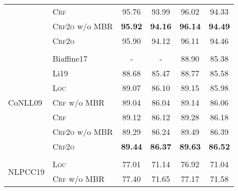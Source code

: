 \begin{table}[tb!]
\begin{tabular}{llcccc}
                             & \textsc{Crf}           & 95.76                   & 93.99                    & 96.02                            & 94.33                            \\
                             & \textsc{Crf2o} w/o MBR & \textbf{95.92}          & \textbf{94.16}           & \textbf{96.14}                   & \textbf{94.49}                   \\
                             & \textsc{Crf2o}         & 95.90                   & 94.12                    & 96.11                            & 94.46                            \\[2pt]
    \hline
    \\[-15pt]
    \multirow{7}{*}{CoNLL09} & Biaffine17             & -                       & -                        & 88.90                            & 85.38                            \\
                             & Li19                   & 88.68                   & 85.47                    & 88.77                            & 85.58                            \\[3pt]
                             & \textsc{Loc}           & 89.07                   & 86.10                    & 89.15                            & 85.98                            \\
                             & \textsc{Crf} w/o MBR   & 89.04                   & 86.04                    & 89.14                            & 86.06                            \\
                             & \textsc{Crf}           & 89.12                   & 86.12                    & 89.28                            & 86.18\rlap{$^\dagger$}           \\
                             & \textsc{Crf2o} w/o MBR & 89.29                   & 86.24                    & 89.49                            & 86.39                            \\
                             & \textsc{Crf2o}         & \textbf{89.44}          & \textbf{86.37}           & \textbf{89.63}\rlap{$^\ddagger$} & \textbf{86.52}\rlap{$^\ddagger$} \\[2pt]
    \hline
    \\[-15pt]
    \multirow{5}{*}{NLPCC19} & \textsc{Loc}           & 77.01                   & 71.14                    & 76.92                            & 71.04                            \\
                             & \textsc{Crf} w/o MBR   & 77.40                   & 71.65                    & 77.17                            & 71.58                            \\

\end{tabular}
\end{table}
